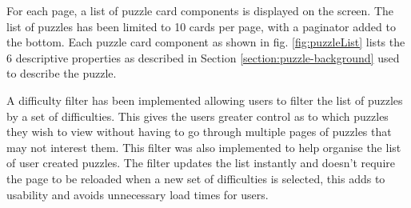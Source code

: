\documentclass{l4proj}
\begin{document}
For each page, a list of puzzle card components is displayed on the screen. The list of puzzles has been limited to 10 cards per page, with a paginator added to the bottom. Each puzzle card component as shown in fig. \ref{fig:puzzleList} lists the 6 descriptive properties as described in Section \ref{section:puzzle-background} used to describe the puzzle.  

A difficulty filter has been implemented allowing users to filter the list of puzzles by a set of difficulties. This gives the users greater control as to which puzzles they wish to view without having to go through multiple pages of puzzles that may not interest them. This filter was also implemented to help organise the list of user created puzzles. The filter updates the list instantly and doesn't require the page to be reloaded when a new set of difficulties is selected, this adds to usability and avoids unnecessary load times for users.


\end{document}

